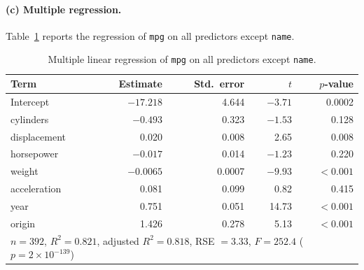 \documentclass[11pt]{article}
\begin{document}
\paragraph{(c) Multiple regression.}
Table~\ref{tab:auto-9c} reports the regression of \texttt{mpg} on all predictors except \texttt{name}.

\begin{table}[H]
  \centering
  \begin{tabular}{lrrrr}
    \toprule
    Term & Estimate & Std.\ error & $t$ & $p$-value \\
    \midrule
    Intercept    & $-17.218$ & 4.644 & $-3.71$ & 0.0002 \\
    cylinders    & $-0.493$  & 0.323 & $-1.53$ & 0.128 \\
    displacement & 0.020     & 0.008 & 2.65    & 0.008 \\
    horsepower   & $-0.017$  & 0.014 & $-1.23$ & 0.220 \\
    weight       & $-0.0065$ & 0.0007 & $-9.93$ & $<0.001$ \\
    acceleration & 0.081     & 0.099 & 0.82    & 0.415 \\
    year         & 0.751     & 0.051 & 14.73   & $<0.001$ \\
    origin       & 1.426     & 0.278 & 5.13    & $<0.001$ \\
    \midrule
    \multicolumn{5}{l}{$n = 392$, \quad $R^2 = 0.821$, \quad adjusted $R^2 = 0.818$, \quad RSE $= 3.33$, \quad $F = 252.4$ ($p = 2\times10^{-139}$)} \\
    \bottomrule
  \end{tabular}
  \caption{Multiple linear regression of \texttt{mpg} on all predictors except \texttt{name}.}
  \label{tab:auto-9c}
\end{table}
\end{document}
